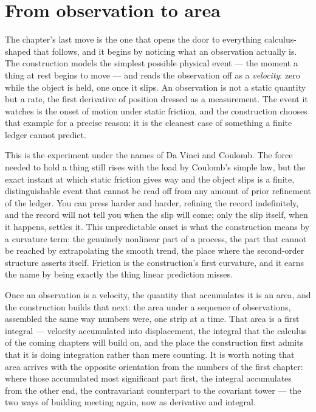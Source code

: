 \section{From observation to area}
\label{se:from-observation-to-area}

The chapter's last move is the one that opens the door to everything calculus-shaped that follows, and
it begins by noticing what an observation actually is. The construction models the simplest possible
physical event --- the moment a thing at rest begins to move --- and reads the observation off as a
\emph{velocity}: zero while the object is held, one once it slips. An observation is not a static
quantity but a rate, the first derivative of position dressed as a measurement. The event it watches
is the onset of motion under static friction, and the construction chooses that example for a precise
reason: it is the cleanest case of something a finite ledger cannot predict.

This is the experiment under the names of Da Vinci and Coulomb. The force needed to hold a thing
still rises with the load by Coulomb's simple law, but the exact instant at which static friction
gives way and the object slips is a finite, distinguishable event that cannot be read off from any
amount of prior refinement of the ledger. You can press harder and harder, refining the record
indefinitely, and the record will not tell you when the slip will come; only the slip itself, when it
happens, settles it. This unpredictable onset is what the construction means by a curvature term: the
genuinely nonlinear part of a process, the part that cannot be reached by extrapolating the smooth
trend, the place where the second-order structure asserts itself. Friction is the construction's first
curvature, and it earns the name by being exactly the thing linear prediction misses.

Once an observation is a velocity, the quantity that accumulates it is an area, and the construction
builds that next: the area under a sequence of observations, assembled the same way numbers were, one
strip at a time. That area is a first integral --- velocity accumulated into displacement, the
integral that the calculus of the coming chapters will build on, and the place the construction first
admits that it is doing integration rather than mere counting. It is worth noting that area arrives
with the opposite orientation from the numbers of the first chapter: where those accumulated most
significant part first, the integral accumulates from the other end, the contravariant counterpart to
the covariant tower --- the two ways of building meeting again, now as derivative and integral.

